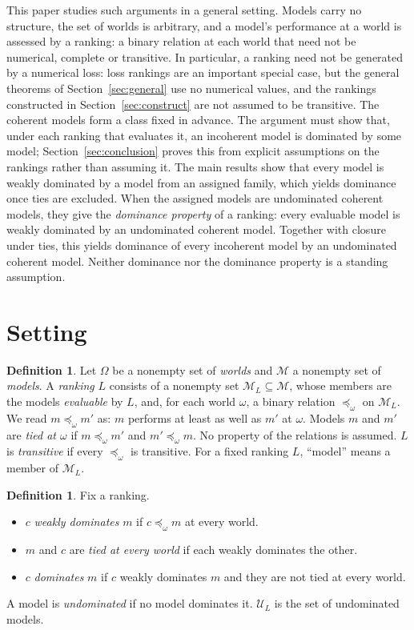 \documentclass[11pt]{article}
\theoremstyle{definition}
\newtheorem{definition}[theorem]{Definition}
\newcommand{\M}{\mathcal M}
\newcommand{\U}{\mathcal U}
\begin{document}
This paper studies such arguments in a general setting. Models carry no structure, the set of worlds is arbitrary, and a model's performance at a world is assessed by a ranking: a binary relation at each world that need not be numerical, complete or transitive. In particular, a ranking need not be generated by a numerical loss: loss rankings are an important special case, but the general theorems of Section~\ref{sec:general} use no numerical values, and the rankings constructed in Section~\ref{sec:construct} are not assumed to be transitive. The coherent models form a class fixed in advance. The argument must show that, under each ranking that evaluates it, an incoherent model is dominated by some model; Section~\ref{sec:conclusion} proves this from explicit assumptions on the rankings rather than assuming it. The main results show that every model is weakly dominated by a model from an assigned family, which yields dominance once ties are excluded. When the assigned models are undominated coherent models, they give the \emph{dominance property} of a ranking: every evaluable model is weakly dominated by an undominated coherent model. Together with closure under ties, this yields dominance of every incoherent model by an undominated coherent model. Neither dominance nor the dominance property is a standing assumption.




\newpage


\section{Setting}\label{sec:setting}

\begin{definition}\label{def:rankings}
Let $\Omega$ be a nonempty set of \emph{worlds} and $\M$ a nonempty set of \emph{models}. A \emph{ranking} $L$ consists of a nonempty set $\M_L\subseteq\M$, whose members are the models \emph{evaluable} by $L$, and, for each world $\omega$, a binary relation $\preceq_\omega$ on $\M_L$. We read $m\preceq_\omega m'$ as: $m$ performs at least as well as $m'$ at $\omega$. Models $m$ and $m'$ are \emph{tied at $\omega$} if $m\preceq_\omega m'$ and $m'\preceq_\omega m$. No property of the relations is assumed. $L$ is \emph{transitive} if every $\preceq_\omega$ is transitive. For a fixed ranking $L$, ``model'' means a member of $\M_L$.
\end{definition}

\begin{definition}\label{def:dominance}
Fix a ranking.
\begin{itemize}[leftmargin=*]
\item $c$ \emph{weakly dominates} $m$ if $c\preceq_\omega m$ at every world.
\item $m$ and $c$ are \emph{tied at every world} if each weakly dominates the other.
\item $c$ \emph{dominates} $m$ if $c$ weakly dominates $m$ and they are not tied at every world.
\end{itemize}
A model is \emph{undominated} if no model dominates it. $\U_L$ is the set of undominated models.
\end{definition}
\end{document}

